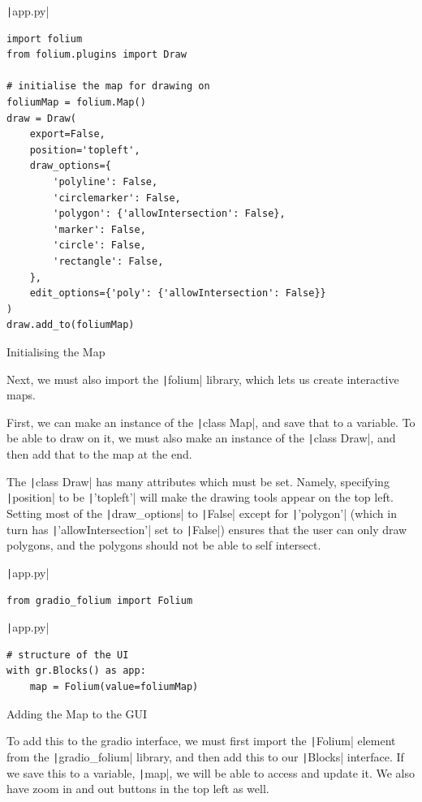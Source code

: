 \documentclass[12pt]{report}
\newcommand{\pil}[1]{\protect\texttt|#1|}
\begin{document}
\begin{listing}[H]
\pil{app.py}
\begin{verbatim}
import folium
from folium.plugins import Draw

# initialise the map for drawing on
foliumMap = folium.Map()
draw = Draw(
    export=False,
    position='topleft',
    draw_options={
        'polyline': False,
        'circlemarker': False,
        'polygon': {'allowIntersection': False},
        'marker': False,
        'circle': False,
        'rectangle': False,
    },
    edit_options={'poly': {'allowIntersection': False}}
)
draw.add_to(foliumMap)
\end{verbatim}
\caption{Initialising the Map}\label{cs:initialiseDrawingMap}
\end{listing}

Next, we must also import the \pil{folium} library, which lets us create interactive maps.

First, we can make an instance of the \pil{class Map}, and save that to a variable. To be able to draw on it, we must also make an instance of the \pil{class Draw}, and then add that to the map at the end.

The \pil{class Draw} has many attributes which must be set. Namely, specifying \pil{position} to be \pil{'topleft'} will make the drawing tools appear on the top left. Setting most of the \pil{draw_options} to \pil{False} except for \pil{'polygon'} (which in turn has \pil{'allowIntersection'} set to \pil{False}) ensures that the user can only draw polygons, and the polygons should not be able to self intersect.

\begin{listing}[H]
\pil{app.py}
\begin{verbatim}
from gradio_folium import Folium
\end{verbatim}
\pil{app.py}
\begin{verbatim}
# structure of the UI
with gr.Blocks() as app:
    map = Folium(value=foliumMap)
\end{verbatim}
\caption{Adding the Map to the GUI}\label{cs:addMapToGUI}
\end{listing}

To add this to the gradio interface, we must first import the \pil{Folium} element from the \pil{gradio_folium} library, and then add this to our \pil{Blocks} interface. If we save this to a variable, \pil{map}, we will be able to access and update it. We also have zoom in and out buttons in the top left as well.
\end{document}
